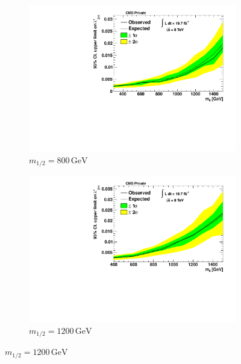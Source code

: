 \begin{figure}[!p]
  \begin{subfigure}[b]{0.495\textwidth}
    \centering
    \includegraphics[width=\textwidth]{plots/limit_m12_800.pdf}
    \setlength{\abovecaptionskip}{-20pt}
    \setlength{\belowcaptionskip}{10pt}
    \caption{$m_{1/2} = 800\,\text{GeV}$\label{fig:limit-m12-800}}
  \end{subfigure}
  \begin{subfigure}[b]{0.495\textwidth}
    \centering
    \includegraphics[width=\textwidth]{plots/limit_m12_1200.pdf}
    \setlength{\abovecaptionskip}{-20pt}
    \setlength{\belowcaptionskip}{10pt}
    \caption{$m_{1/2} = 1200\,\text{GeV}$\label{fig:limit-m12-1200}}
  \end{subfigure}


\end{figure}
